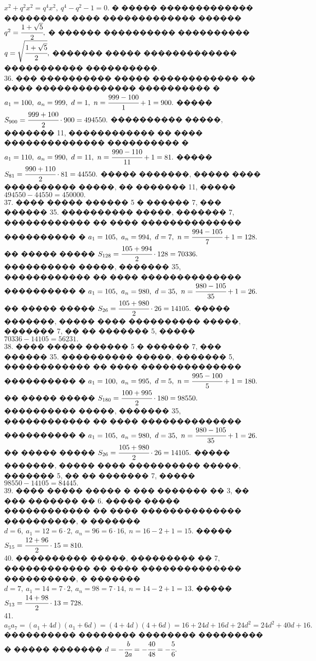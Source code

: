 \documentclass[12pt]{article}
\begin{document}
$x^2+q^2x^2=q^4x^2,\ q^4-q^2-1=0.$ � ����� ������������� ��������� ���� ������������� ������ $q^2=\cfrac{1+\sqrt{5}}{2},$ � ������ ���������� ���������� $q=\sqrt{\cfrac{1+\sqrt{5}}{2}},$ ������� ����� ������������� ����������� ����������.\\
36. ��� ���������� ����� ������������ �� ���� �������������� ���������� � $a_1=100,\ a_n=999,\ d=1,\ n=\cfrac{999-100}{1}+1=900.$ ����� $S_{900}=\cfrac{999+100}{2}\cdot900=494550.$ ���������� �����, ������� 11, ������������ �� ���� �������������� ���������� � $a_1=110,\ a_n=990,\ d=11,\ n=\cfrac{990-110}{11}+1=81.$ ����� $S_{81}=\cfrac{990+110}{2}\cdot81=44550.$ ����� �������, ����� ���� ���������� �����, �� ������� 11, ����� $494550-44550=450000.$\\
37. ���� ����� ������ 5 � ������ 7, ��� ������ 35. ���������� �����, ������� 7, ������������ �� ���� �������������� ���������� � $a_1=105,\ a_n=994,\ d=7,\ n=\cfrac{994-105}{7}+1=128.$ �� ����� ����� $S_{128}=\cfrac{105+994}{2}\cdot128=70336.$ ���������� �����, ������� 35, ������������ �� ���� �������������� ���������� � $a_1=105,\ a_n=980,\ d=35,\ n=\cfrac{980-105}{35}+1=26.$ �� ����� ����� $S_{26}=\cfrac{105+980}{2}\cdot26=14105.$ ����� �������, ����� ���� ���������� �����, ������� 7, �� �� ������� 5, ����� $70336-14105=56231.$\\
38. ���� ����� ������ 5 � ������ 7, ��� ������ 35. ���������� �����, ������� 5, ������������ �� ���� �������������� ���������� � $a_1=100,\ a_n=995,\ d=5,\ n=\cfrac{995-100}{5}+1=180.$ �� ����� ����� $S_{180}=\cfrac{100+995}{2}\cdot180=98550.$ ���������� �����, ������� 35, ������������ �� ���� �������������� ���������� � $a_1=105,\ a_n=980,\ d=35,\ n=\cfrac{980-105}{35}+1=26.$ �� ����� ����� $S_{26}=\cfrac{105+980}{2}\cdot26=14105.$ ����� �������, ����� ���� ���������� �����, ������� 5, �� �� ������� 7, ����� $98550-14105=84445.$\\
39. ���� ����� ����� � ��� ������� �� 3, �� ��� ������� �� 6. ����� ����� ������������ �� ���� �������������� ����������, � ������� $d=6,\ a_1=12=6\cdot2,\ a_n=96=6\cdot16,\ n=16-2+1=15.$ ����� $S_{15}=\cfrac{12+96}{2}\cdot15=810.$\\
40. ���������� �����, ��������� �� 7, ������������ �� ���� �������������� ����������, � ������� $d=7,\ a_1=14=7\cdot2,\ a_n=98=7\cdot14,\ n=14-2+1=13.$ �����
$S_{13}=\cfrac{14+98}{2}\cdot13=728.$\\
41. $a_5a_7=(a_1+4d)(a_1+6d)=(4+4d)(4+6d)=16+24d+16d+24d^2=24d^2+40d+16.$ ���������� �������� �������� ��������� � ����� ������� $d=-\cfrac{b}{2a}=-\cfrac{40}{48}=-\cfrac{5}{6}.$\\
\end{document}
